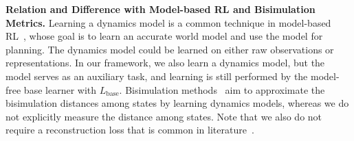 \textbf{Relation and Difference with Model-based RL and Bisimulation Metrics.}
Learning a dynamics model is a common technique in model-based RL~\citep{kipf2019contrastive,grimm2020value}, whose goal is to learn an accurate world model and use the model for planning. The dynamics model could be learned on either raw observations or representations. In our framework, we also learn a dynamics model, but the model serves as an auxiliary task, and learning is still performed by the model-free base learner with $L_{\mathrm{base}}$. Bisimulation methods~\citep{castro2020scalable,zhang2020learning} aim to approximate the bisimulation distances among states by learning dynamics models, whereas we do not explicitly measure the distance among states. 
Note that we also do not require a reconstruction loss that is common in literature~\citep{lee2019stochastic}.








